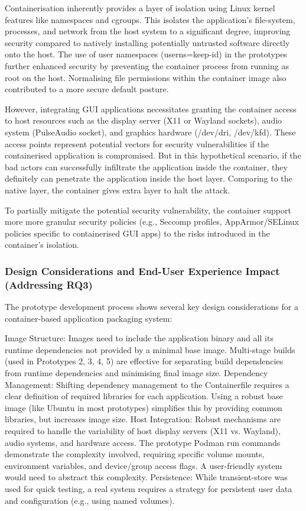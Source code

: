 \documentclass[journal,onecolumn]{IEEEtran}
\begin{document}
Containerisation inherently provides a layer of isolation using Linux kernel features like namespaces and cgroups. This isolates the application's file-system, processes, and network from the host system to a significant degree, improving security compared to natively installing potentially untrusted software directly onto the host. The use of user namespaces (userns=keep-id) in the prototypes further enhanced security by preventing the container process from running as root on the host. Normalising file permissions within the container image also contributed to a more secure default posture.

However, integrating GUI applications necessitates granting the container access to host resources such as the display server (X11 or Wayland sockets), audio system (PulseAudio socket), and graphics hardware (/dev/dri, /dev/kfd). These access points represent potential vectors for security vulnerabilities if the containerised application is compromised. But in this hypothetical scenario, if the bad actors can successfully infiltrate the application inside the container, they definitely can penetrate the application inside the host layer. Comparing to the native layer, the container gives extra layer to halt the attack. 

To partially mitigate the potential security vulnerability, the container support more more granular security policies (e.g., Seccomp profiles, AppArmor/SELinux policies specific to containerised GUI apps) to the risks introduced in the container's isolation.

\subsubsection{Design Considerations and End-User Experience Impact (Addressing RQ3)}

The prototype development process shows several key design considerations for a container-based application packaging system:

Image Structure: Images need to include the application binary and all its runtime dependencies not provided by a minimal base image. Multi-stage builds (used in Prototypes 2, 3, 4, 5) are effective for separating build dependencies from runtime dependencies and minimising final image size.
Dependency Management: Shifting dependency management to the Containerfile requires a clear definition of required libraries for each application. Using a robust base image (like Ubuntu in most prototypes) simplifies this by providing common libraries, but increases image size.
Host Integration: Robust mechanisms are required to handle the variability of host display servers (X11 vs. Wayland), audio systems, and hardware access. The prototype Podman run commands demonstrate the complexity involved, requiring specific volume mounts, environment variables, and device/group access flags. A user-friendly system would need to abstract this complexity.
Persistence: While transient-store was used for quick testing, a real system requires a strategy for persistent user data and configuration (e.g., using named volumes).
\end{document}
